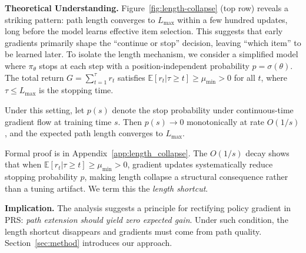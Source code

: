 \textbf{Theoretical Understanding.} Figure~\ref{fig:length-collapse} (top row) reveals a striking pattern: path length converges to $L_{\max}$ within a few hundred updates, long before the model learns effective item selection. This suggests that early gradients primarily shape the ``continue or stop'' decision, leaving ``which item'' to be learned later. To isolate the length mechanism, we consider a simplified model where $\pi_\theta$ stops at each step with a position-independent probability $p=\sigma(\theta)$. The total return $G=\sum_{t=1}^{\tau} r_t$ satisfies $\mathbb{E}[r_t|\tau\ge t]\ge \mu_{\min}>0$ for all $t$, where $\tau\le L_{\max}$ is the stopping time.
\begin{theorem}
\label{thm:collapse}
Under this setting, let $p(s)$ denote the stop probability under continuous-time gradient flow at training time $s$. Then $p(s) \to 0$ monotonically at rate $O(1/s)$, and the expected path length converges to $L_{\max}$.
\end{theorem}
Formal proof is in Appendix~\ref{app:length_collapse}. The $O(1/s)$ decay shows that when $\mathbb{E}[r_t|\tau\ge t]\ge \mu_{\min}>0$, gradient updates systematically reduce stopping probability $p$, making length collapse a structural consequence rather than a tuning artifact. We term this the \emph{length shortcut}.
 
\textbf{Implication.} The analysis suggests a principle for rectifying policy gradient in PRS: \emph{path extension should yield zero expected gain}. Under such condition, the length shortcut disappears and gradients must come from path quality. Section~\ref{sec:method} introduces our approach.

